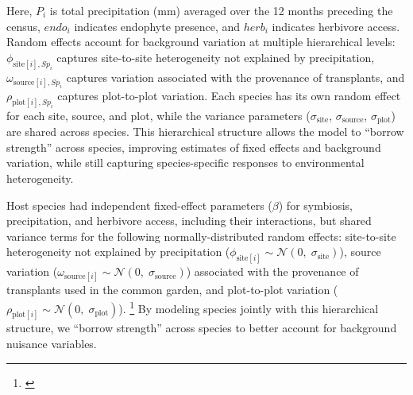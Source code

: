 \documentclass[12pt]{article}\usepackage[]{graphicx}\usepackage[dvipsnames]{xcolor}
\newcommand{\tom}[2]{{\color{red}{#1}}\footnote{\textit{\color{red}{#2}}}}
\begin{document}
\noindent Here, $P_i$ is total precipitation (mm) averaged over the 12 months preceding the census, $endo_i$ indicates endophyte presence, and $herb_i$ indicates herbivore access. Random effects account for background variation at multiple hierarchical levels: $\phi_{\text{site}[i],Sp_i}$ captures site-to-site heterogeneity not explained by precipitation, $\omega_{\text{source}[i],Sp_i}$ captures variation associated with the provenance of transplants, and $\rho_{\text{plot}[i],Sp_i}$ captures plot-to-plot variation. Each species has its own random effect for each site, source, and plot, while the variance parameters ($\sigma_{\text{site}}$, $\sigma_{\text{source}}$, $\sigma_{\text{plot}}$) are shared across species. This hierarchical structure allows the model to ``borrow strength'' across species, improving estimates of fixed effects and background variation, while still capturing species-specific responses to environmental heterogeneity.

Host species had independent fixed-effect parameters ($\beta$) for symbiosis, precipitation, and herbivore access, including their interactions, but shared variance terms for the following normally-distributed random effects: 
site-to-site heterogeneity not explained by precipitation ($\phi_{\text{site}[i]} \sim \mathcal{N}(0,\; \sigma_{\text{site}})$), source variation ($\omega_{\text{source}[i]} \sim \mathcal{N}(0,\; \sigma_{\text{source}})$) associated with the provenance of transplants used in the common garden, and plot-to-plot variation ($\rho_{\text{plot}[i]} \sim \mathcal{N}(0,\; \sigma_{\text{plot}})$). 
\tom{}{Question about the random effects. Did you you force species to share the deviates $\phi$, $\omega$, and $\rho$, or did they have unique deviates and only shared variances. Another way of asking that is, for example, is there a single pooled random effect for each site, or does each species get its own site random effect? I think we would want the latter, which would say that each species can do better or worse at different sites, even as they have the same distribution across sites.}
By modeling species jointly with this hierarchical structure, we ``borrow strength'' across species to better account for background nuisance variables.
\end{document}
